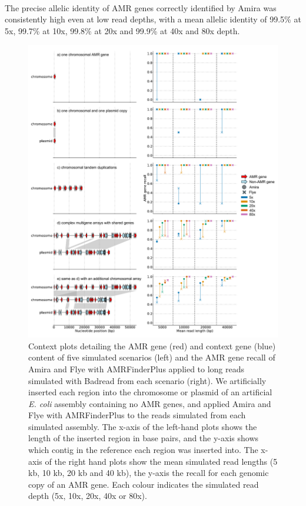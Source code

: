 \paragraph{}
The precise allelic identity of AMR genes correctly identified by Amira was consistently high even at low read depths, with a mean allelic identity of 99.5\% at 5x, 99.7\% at 10x, 99.8\% at 20x and 99.9\% at 40x and 80x depth.

\begin{figure}
\centering
\includegraphics[width=1\linewidth]{Figures/figure_2.pdf}
\caption{Context plots detailing the AMR gene (red) and context gene (blue) content of five simulated scenarios (left) and the AMR gene recall of Amira and Flye with AMRFinderPlus applied to long reads simulated with Badread \cite{Wick2019} from each scenario (right). We artificially inserted each region into the chromosome or plasmid of an artificial \textit{E. coli} assembly containing no AMR genes, and applied Amira and Flye with AMRFinderPlus to the reads simulated from each simulated assembly. The x-axis of the left-hand plots shows the length of the inserted region in base pairs, and the y-axis shows which contig in the reference each region was inserted into. The x-axis of the right hand plots show the mean simulated read lengths (5 kb, 10 kb, 20 kb and 40 kb), the y-axis the recall for each genomic copy of an AMR gene. Each colour indicates the simulated read depth (5x, 10x, 20x, 40x or 80x).}
\label{fig:2}
\end{figure}

